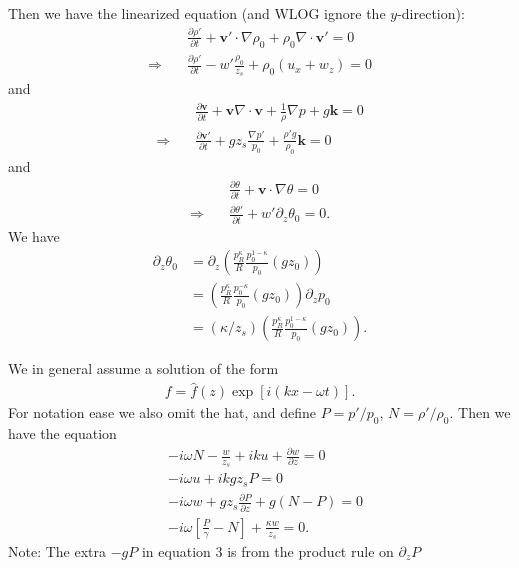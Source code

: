 \documentclass[11pt,letterpaper]{book}
\theoremstyle{definition}
\newcommand{\pe}{\partial}
\newcommand{\ve}[1]{\boldsymbol{#1}}
\newcommand{\thus}{\Rightarrow \quad }
\begin{document}
Then we have the linearized equation (and WLOG ignore the $y$-direction):
\begin{align*}
& \frac{\pe\rho'}{\pe t}+\ve v' \cdot\nabla \rho_0+\rho_0\nabla\cdot\ve v' = 0\\
\thus& \frac{\pe\rho'}{\pe t}-w'\frac{\rho_0}{z_s}+\rho_0(u_x+w_z) = 0
\end{align*}
and
\begin{align*}
& \frac{\pe\ve v}{\pe t}+\ve v\nabla\cdot \ve v+\frac{1}{\rho}\nabla p+g\ve k = 0\\
\thus& \frac{\pe\ve v'}{\pe t}+gz_s\frac{\nabla p'}{p_0}+\frac{\rho'g}{\rho_0}\ve k = 0
\end{align*}
and
\begin{align*}
& \frac{\pe\theta}{\pe t}+\ve v\cdot\nabla\theta = 0\\
\thus &\frac{\pe\theta'}{\pe t}+w'\pe_z\theta_{0} = 0.
\end{align*}
We have
\begin{align*}
\pe_z\theta_{0} &= \pe_z \left(\frac{p_R^\kappa}{R}\frac{p_0^{1-\kappa}}{p_0}(gz_0)\right)\\
&= \left(\frac{p_R^\kappa}{R}\frac{p_0^{-\kappa}}{p_0}(gz_0)\right)\pe_z p_0\\
&= (\kappa/z_s) \left(\frac{p_R^\kappa}{R}\frac{p_0^{1-\kappa}}{p_0}(gz_0)\right).
\end{align*}

We in general assume a solution of the form
\begin{align*}
f = \hat{f}(z)\exp[i(kx-\omega t)].
\end{align*}
For notation ease we also omit the hat, and define $P = p'/p_0$, $N = \rho'/\rho_0$. Then we have the equation
\begin{align*}
& -i\omega N-\frac{w}{z_s}+iku+\frac{\pe w}{\pe z} = 0\\
& -i\omega u+ikgz_sP = 0\\
& -i\omega w+gz_s\frac{\pe P}{\pe z}+g(N-P) = 0\\
& -i\omega \left[\frac{P}{\gamma}-N\right]+\frac{\kappa w}{z_s} = 0.
\end{align*}
Note: The extra $-gP$ in equation 3 is from the product rule on $\pe_z P$
\end{document}
